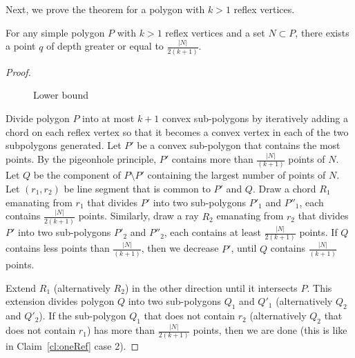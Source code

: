 \documentclass{article}
\begin{document}
Next, we prove the theorem for a polygon with $k>1$ reflex vertices.
\begin{clm} 
For any simple polygon $P$ with $k>1$ reflex vertices and a set $N \subset P$, 
there exists a point $q$ of depth greater or equal to $\frac{|N|}{2(k+1)}$.
\end{clm}
%
\begin{proof}

\begin{figure}
   \begin{center}
   \end{center}
   \caption{Lower bound}
 \label{fig:LB1}
\end{figure}

Divide polygon $P$ into at most $k+1$ convex sub-polygons by
iteratively adding a chord on each reflex vertex so that it becomes a
convex vertex in each of the two subpolygons generated.
Let $P'$ be a convex sub-polygon that contains the most points. 
By the pigeonhole principle, $P'$ contains more than
$\frac{|N|}{(k+1)}$ points of $N$. 
Let $Q$ be the component of $P\setminus P'$ containing the largest
number of points of $N$.
Let $(r_1,r_2)$ be line segment that is common to $P'$ and $Q$. 
Draw a chord $R_1$ emanating from $r_1$ that divides $P'$ 
into two sub-polygons $P'_1$ and $P''_1$, each contains $\frac{|N|}{2(k+1)}$ points. 
Similarly, draw a ray $R_2$ emanating from $r_2$ that divides $P'$ 
into two sub-polygons $P'_2$ and $P''_2$, each contains at least $\frac{|N|}{2(k+1)}$ points.
If $Q$ contains less points than $\frac{|N|}{(k+1)}$, then we decrease $P'$, until $Q$ contains  $\frac{|N|}{(k+1)}$ points.

Extend $R_1$ (alternatively $R_2$) in the other direction until it intersects $P$.
This extension divides polygon $Q$ into two sub-polygons $Q_1$ and $Q'_1$ (alternatively $Q_2$ and $Q'_2$).
If the sub-polygon $Q_1$ that does not contain $r_2$ (alternatively $Q_2$ that does not contain $r_1$) 
has more than  $\frac{|N|}{2(k+1)}$ points, then we are done (this is like in Claim~\ref{cl:oneRef} case 2).


\end{proof}
\end{document}

